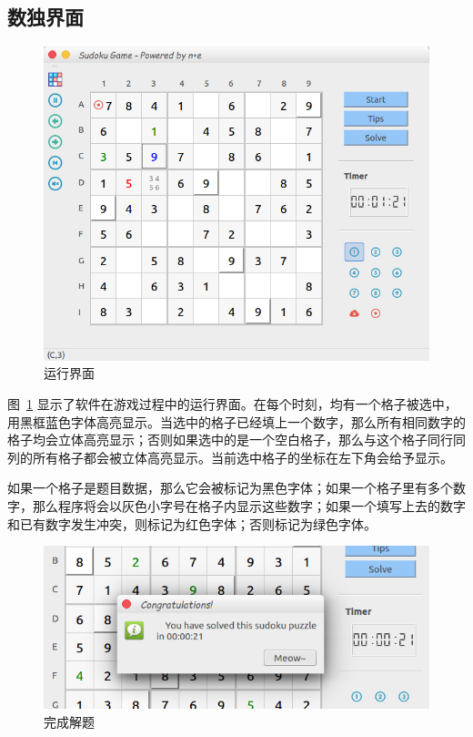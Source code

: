 \documentclass[a4paper]{article}
\begin{document}
\subsection{数独界面}
\begin{figure}[htp]
\centering
\includegraphics[width=1\linewidth]{status.png}
\caption{运行界面}
\label{fig:status}
\end{figure}

图~\ref{fig:status} 显示了软件在游戏过程中的运行界面。在每个时刻，均有一个格子被选中，用黑框蓝色字体高亮显示。当选中的格子已经填上一个数字，那么所有相同数字的格子均会立体高亮显示；否则如果选中的是一个空白格子，那么与这个格子同行同列的所有格子都会被立体高亮显示。当前选中格子的坐标在左下角会给予显示。

如果一个格子是题目数据，那么它会被标记为黑色字体；如果一个格子里有多个数字，那么程序将会以灰色小字号在格子内显示这些数字；如果一个填写上去的数字和已有数字发生冲突，则标记为红色字体；否则标记为绿色字体。

\begin{figure}[htp]
\centering
\includegraphics[width=0.7\linewidth]{finish.png}
\caption{完成解题}
\label{fig:finish}
\end{figure}
\end{document}
